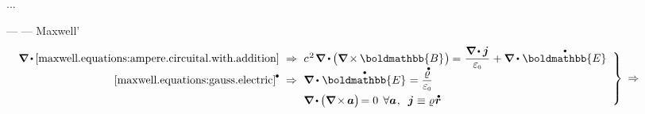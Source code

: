...


\:--- \href{https://en.wikipedia.org/wiki/Continuity_equation}{}  \:---   Maxwell’

\nopagebreak\vspace{.2em}\begin{equation*}
\left.\begin{array}{r@{\hspace{.6em}}c@{\hspace{.6em}}l}
\boldnabla \hspace{-0.1ex} \dotp \hspace{-0.1ex} \eqref{maxwell.equations:ampere.circuital.with.addition}
& \Rightarrow &
c^{\hspace{.16ex}2} \hspace{.22ex} \boldnabla \dotp \hspace{-0.1ex} \bigl( \boldnabla \hspace{-0.15ex} \times \hspace{-0.1ex} \boldmathbb{B} \hspace{.1ex} \bigr) \hspace{-0.1ex}
= \hspace{.1ex} \smash{\displaystyle \frac{\boldnabla \hspace{-0.15ex} \dotp \currentdensity}{\raisemath{.16em}{\vacuumpermittivity}}} \hspace{.1ex} + \boldnabla \dotp \hspace{.1ex} \mathdotabove{\boldmathbb{E}}
\\[.5em]
%
\eqref{maxwell.equations:gauss.electric}^{\hspace{-0.05ex}\tikz[baseline=-0.4ex]\draw[black, fill=black] (0,0) circle (.28ex);}
& \Rightarrow &
\boldnabla \dotp \hspace{.1ex} \mathdotabove{\boldmathbb{E}} \hspace{.1ex} = \smash{\displaystyle \frac{\mathdotabove{\chargedensity}}{\raisemath{.16em}{\vacuumpermittivity}}}
\\[.64em]
%
& &
\boldnabla \hspace{-0.1ex} \dotp \hspace{-0.1ex} \bigl( \boldnabla \hspace{-0.2ex} \times \hspace{-0.16ex} \bm{a} \bigr) \hspace{-0.3ex} = 0 \:\:\forall \bm{a}
\hspace{.1ex} , \hspace{.55em}
\currentdensity \equiv \chargedensity \hspace{.1ex} \mathdotabove{\bm{r}}
\end{array}\hspace{.1ex}\right\rbrace
\hspace{.5ex}\Rightarrow\hspace*{4em}
\end{equation*}
